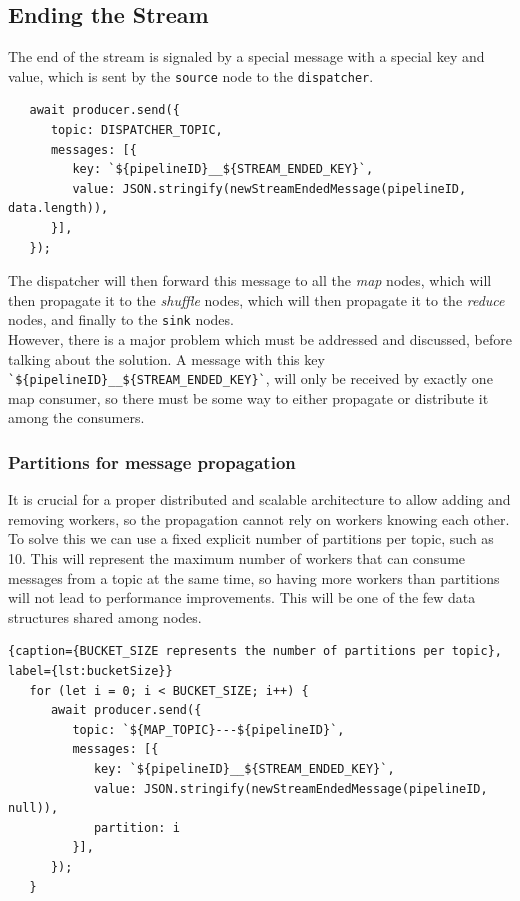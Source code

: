 \subsection{Ending the Stream}
The end of the stream is signaled by a special message with a special key and value, which is sent by the \texttt{source} node to the \texttt{dispatcher}.
\begin{lstlisting}
   await producer.send({
      topic: DISPATCHER_TOPIC,
      messages: [{
         key: `${pipelineID}__${STREAM_ENDED_KEY}`,
         value: JSON.stringify(newStreamEndedMessage(pipelineID, data.length)),
      }],
   });
\end{lstlisting}
 
The dispatcher will then forward this message to all the \textit{map} nodes, which will then propagate it to the \textit{shuffle} nodes, which will then propagate it to the \textit{reduce} nodes, and finally to the \texttt{sink} nodes.\\
However, there is a major problem which must be addressed and discussed, before talking about the solution. A message with this key \lstinline|`${pipelineID}__${STREAM_ENDED_KEY}`|, will only be received by exactly one map consumer, so there must be some way to either propagate or distribute it among the consumers.

\subsubsection{Partitions for message propagation}
It is crucial for a proper distributed and scalable architecture to allow adding and removing workers, so the propagation cannot rely on workers knowing each other.\\
To solve this we can use a fixed explicit number of partitions per topic, such as 10. This will represent the maximum number of workers that can consume messages from a topic at the same time, so having more workers than partitions will not lead to performance improvements.
This will be one of the few data structures shared among nodes.

\begin{lstlisting}{caption={BUCKET_SIZE represents the number of partitions per topic}, label={lst:bucketSize}}
   for (let i = 0; i < BUCKET_SIZE; i++) {
      await producer.send({
         topic: `${MAP_TOPIC}---${pipelineID}`,
         messages: [{
            key: `${pipelineID}__${STREAM_ENDED_KEY}`,
            value: JSON.stringify(newStreamEndedMessage(pipelineID, null)),
            partition: i
         }],
      });
   }
\end{lstlisting}

